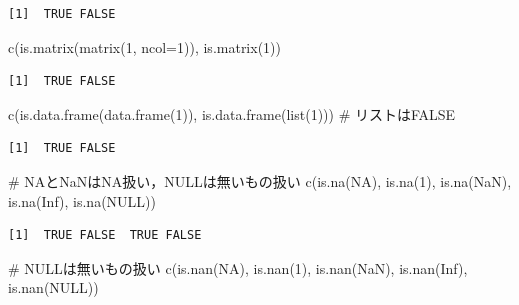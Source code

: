 \documentclass[
  letterpaper,
  DIV=11,
  numbers=noendperiod]{scrreprt}
\newenvironment{Shaded}{\begin{snugshade}}{\end{snugshade}}
\newcommand{\AttributeTok}[1]{\textcolor[rgb]{0.40,0.45,0.13}{#1}}
\newcommand{\CommentTok}[1]{\textcolor[rgb]{0.37,0.37,0.37}{#1}}
\newcommand{\ConstantTok}[1]{\textcolor[rgb]{0.56,0.35,0.01}{#1}}
\newcommand{\DecValTok}[1]{\textcolor[rgb]{0.68,0.00,0.00}{#1}}
\newcommand{\FunctionTok}[1]{\textcolor[rgb]{0.28,0.35,0.67}{#1}}
\newcommand{\NormalTok}[1]{\textcolor[rgb]{0.00,0.23,0.31}{#1}}
\begin{document}
\begin{verbatim}
[1]  TRUE FALSE
\end{verbatim}

\begin{Shaded}
\begin{Highlighting}[]
\FunctionTok{c}\NormalTok{(}\FunctionTok{is.matrix}\NormalTok{(}\FunctionTok{matrix}\NormalTok{(}\DecValTok{1}\NormalTok{, }\AttributeTok{ncol=}\DecValTok{1}\NormalTok{)), }\FunctionTok{is.matrix}\NormalTok{(}\DecValTok{1}\NormalTok{))}
\end{Highlighting}
\end{Shaded}

\begin{verbatim}
[1]  TRUE FALSE
\end{verbatim}

\begin{Shaded}
\begin{Highlighting}[]
\FunctionTok{c}\NormalTok{(}\FunctionTok{is.data.frame}\NormalTok{(}\FunctionTok{data.frame}\NormalTok{(}\DecValTok{1}\NormalTok{)), }\FunctionTok{is.data.frame}\NormalTok{(}\FunctionTok{list}\NormalTok{(}\DecValTok{1}\NormalTok{))) }\CommentTok{\# リストはFALSE}
\end{Highlighting}
\end{Shaded}

\begin{verbatim}
[1]  TRUE FALSE
\end{verbatim}

\begin{Shaded}
\begin{Highlighting}[]
\CommentTok{\# NAとNaNはNA扱い，NULLは無いもの扱い}
\FunctionTok{c}\NormalTok{(}\FunctionTok{is.na}\NormalTok{(}\ConstantTok{NA}\NormalTok{), }\FunctionTok{is.na}\NormalTok{(}\DecValTok{1}\NormalTok{), }\FunctionTok{is.na}\NormalTok{(}\ConstantTok{NaN}\NormalTok{), }\FunctionTok{is.na}\NormalTok{(}\ConstantTok{Inf}\NormalTok{), }\FunctionTok{is.na}\NormalTok{(}\ConstantTok{NULL}\NormalTok{)) }
\end{Highlighting}
\end{Shaded}

\begin{verbatim}
[1]  TRUE FALSE  TRUE FALSE
\end{verbatim}

\begin{Shaded}
\begin{Highlighting}[]
\CommentTok{\# NULLは無いもの扱い}
\FunctionTok{c}\NormalTok{(}\FunctionTok{is.nan}\NormalTok{(}\ConstantTok{NA}\NormalTok{), }\FunctionTok{is.nan}\NormalTok{(}\DecValTok{1}\NormalTok{), }\FunctionTok{is.nan}\NormalTok{(}\ConstantTok{NaN}\NormalTok{), }\FunctionTok{is.nan}\NormalTok{(}\ConstantTok{Inf}\NormalTok{), }\FunctionTok{is.nan}\NormalTok{(}\ConstantTok{NULL}\NormalTok{))}
\end{Highlighting}
\end{Shaded}
\end{document}
